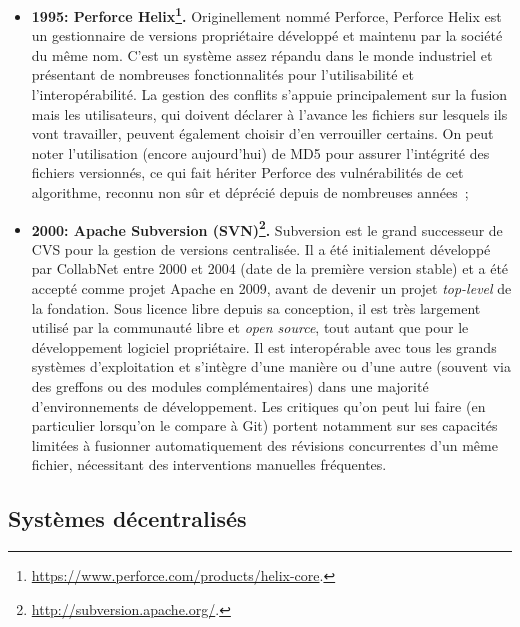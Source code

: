 \begin{itemize}
\item \textbf{1995: Perforce
    Helix\footnote{\url{https://www.perforce.com/products/helix-core}.}.} Originellement nommé Perforce, Perforce Helix est un
  gestionnaire de versions propriétaire développé et maintenu par la
  société du même nom. C'est un système assez répandu dans le monde
  industriel et présentant de nombreuses fonctionnalités pour
  l'utilisabilité et l'interopérabilité. La gestion des conflits
  s'appuie principalement sur la fusion mais les utilisateurs, qui
  doivent déclarer à l'avance les fichiers sur lesquels ils vont
  travailler, peuvent également choisir d'en verrouiller certains. On
  peut noter l'utilisation (encore aujourd'hui) de MD5 pour
  assurer l'intégrité des fichiers versionnés, ce qui fait hériter
  Perforce des vulnérabilités de cet algorithme, reconnu non sûr et
  déprécié depuis de nombreuses années~;
\item \textbf{2000: Apache Subversion
    (SVN)\footnote{\url{http://subversion.apache.org/}.}.}
  Subversion est le grand successeur de CVS pour la gestion de
  versions centralisée. Il a été initialement développé par CollabNet
  entre 2000 et 2004 (date de la première version stable) et a été
  accepté comme projet Apache en 2009, avant de devenir un projet
  \textit{top-level} de la fondation. Sous licence libre depuis sa
  conception, il est très largement utilisé par la communauté libre et
  \textit{open source}, tout autant que pour le développement logiciel
  propriétaire. Il est interopérable avec tous les grands systèmes
  d'exploitation et s'intègre d'une manière ou d'une autre (souvent
  via des greffons ou des modules complémentaires) dans une majorité
  d'environnements de développement. Les critiques qu'on peut lui
  faire (en particulier lorsqu'on le compare à Git) portent notamment
  sur ses capacités limitées à fusionner automatiquement des révisions
  concurrentes d'un même fichier, nécessitant des interventions
  manuelles fréquentes.
\end{itemize}

\subsection{Systèmes décentralisés} %

